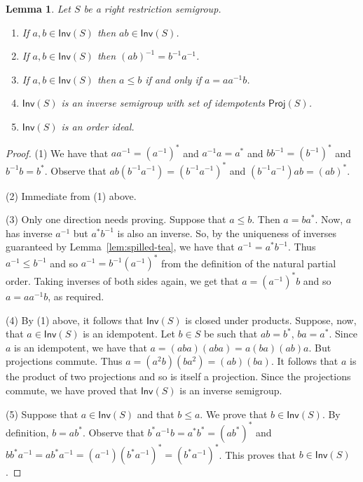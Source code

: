 \documentclass[a4paper]{amsart}
\newtheorem{lemma}[theorem]{Lemma}
\begin{document}
\begin{lemma}\label{lem:holdo} Let $S$ be a right restriction semigroup.
\begin{enumerate}

\item If $a,b \in \mathsf{Inv}(S)$ then $ab \in \mathsf{Inv}(S)$. 

\item If $a,b \in \mathsf{Inv}(S)$ then $(ab)^{-1} = b^{-1}a^{-1}$.

\item If $a,b \in \mathsf{Inv}(S)$ then 
$a \leq b$ if and only if $a = aa^{-1}b$.

\item $\mathsf{Inv}(S)$ is an inverse semigroup with set of idempotents $\mathsf{Proj}(S)$.

\item $\mathsf{Inv}(S)$ is an order ideal.

\end{enumerate}
\end{lemma}
\begin{proof} (1) We have that
$aa^{-1} = (a^{-1})^{\ast}$ and $a^{-1}a = a^{\ast}$
and
$bb^{-1} = (b^{-1})^{\ast}$ and $b^{-1}b = b^{\ast}$.
Observe that
$ab(b^{-1}a^{-1}) =(b^{-1}a^{-1})^{\ast}$ and $(b^{-1}a^{-1})ab = (ab)^{\ast}$.

(2) Immediate from (1) above.

(3) Only one direction needs proving.
Suppose that $a \leq b$.
Then $a = ba^{\ast}$.
Now, $a$ has inverse $a^{-1}$ but $a^{\ast}b^{-1}$ is also an inverse.
So, by the uniqueness of inverses  guaranteed by Lemma~\ref{lem:spilled-tea},
we have that $a^{-1} = a^{\ast}b^{-1}$.
Thus $a^{-1} \leq b^{-1}$ and so
$a^{-1} = b^{-1}(a^{-1})^{\ast}$ from the definition of the natural partial order.
Taking inverses of both sides again, we get that $a = (a^{-1})^{\ast}b$ 
and so $a = aa^{-1}b$, as required.

(4) By (1) above, it follows that $\mathsf{Inv}(S)$ is closed under products. 
Suppose, now, that $a \in \mathsf{Inv}(S)$ is an idempotent.
Let $b \in S$ be such that $ab = b^{\ast}$, $ba = a^{\ast}$.
Since $a$ is an idempotent, we have that $a = (aba)(aba) = a(ba)(ab)a$.
But projections commute.
Thus $a = (a^{2}b)(ba^{2}) = (ab)(ba)$.
It follows that $a$ is the product of two projections and so is itself a projection.
Since the projections commute, we have proved that $\mathsf{Inv}(S)$ is an inverse semigroup.

(5) Suppose that $a \in \mathsf{Inv}(S)$ and that $b \leq a$.
We prove that $b \in \mathsf{Inv}(S)$. 
By definition, $b = ab^{\ast}$.
Observe that
$b^{\ast}a^{-1}b = a^{\ast}b^{\ast} = (ab^{\ast})^{\ast}$
and
$bb^{\ast}a^{-1} = ab^{\ast}a^{-1} = (a^{-1})(b^{\ast}a^{-1})^{\ast} = (b^{\ast}a^{-1})^{\ast}$.
This proves that $b \in \mathsf{Inv}(S)$.
\end{proof}
\end{document}
